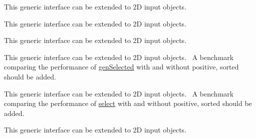 \begin{DoxyRefList}
\item[Type \mbox{\hyperlink{interfaceArrayResize__mod_1_1resize}{Array\+Resize\+\_\+mod\+::resize}} ]\label{todo__todo000014}%
%
 This generic interface can be extended to 2D input objects. ~\newline
 
\item[Type \mbox{\hyperlink{interfaceArrayReverse__mod_1_1genReverse}{Array\+Reverse\+\_\+mod\+::gen\+Reverse}} ]\label{todo__todo000015}%
%
 This generic interface can be extended to 2D input objects. ~\newline
 
\item[Type \mbox{\hyperlink{interfaceArrayReverse__mod_1_1reverse}{Array\+Reverse\+\_\+mod\+::reverse}} ]\label{todo__todo000016}%
%
 This generic interface can be extended to 2D input objects. ~\newline
 
\item[Type \mbox{\hyperlink{interfaceArraySelect__mod_1_1genSelected}{Array\+Select\+\_\+mod\+::gen\+Selected}} ]\label{todo__todo000017}%
%
 This generic interface can be extended to 2D input objects.~\newline
 A benchmark comparing the performance of \mbox{\hyperlink{interfaceArraySelect__mod_1_1genSelected}{gen\+Selected}} with and without {\ttfamily positive, sorted} should be added.~\newline
 
\item[Type \mbox{\hyperlink{interfaceArraySelect__mod_1_1select}{Array\+Select\+\_\+mod\+::select}} ]\label{todo__todo000018}%
%
 This generic interface can be extended to 2D input objects.~\newline
 A benchmark comparing the performance of \mbox{\hyperlink{interfaceArraySelect__mod_1_1select}{select}} with and without {\ttfamily positive, sorted} should be added.~\newline
 
\item[Type \mbox{\hyperlink{interfaceArrayShuffle__mod_1_1shuffle}{Array\+Shuffle\+\_\+mod\+::shuffle}} ]\label{todo__todo000019}%
%
 This generic interface can be extended to 2D input objects. ~\newline
 

\end{DoxyRefList}
